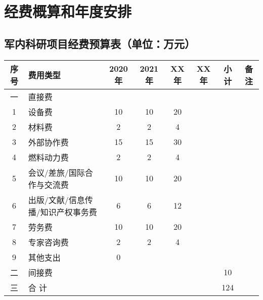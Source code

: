 


\section{经费概算和年度安排}


\subsection{军内科研项目经费预算表（单位：万元）}

\begin{table}[H]
	\centering
	\begin{tabular}{c m{4cm} cccccc}
		\toprule
		序号 & 费用类型                          & 2020年 & 2021年 & XX年 & XX年 & 小计 & 备注 \\
		\midrule
		一   & 直接费                                                                          \\
		1    & 设备费                            & 10     & 10     & 20                        \\
		2    & 材料费                            & 2      & 2      & 4                         \\
		3    & 外部协作费                        & 15     & 15     & 30                        \\
		4    & 燃料动力费                        & 2      & 2      & 4                         \\
		5    & 会议/差旅/国际合作与交流费        & 10     & 10     & 20                        \\
		6    & 出版/文献/信息传播/知识产权事务费 & 6      & 6      & 12                        \\
		7    & 劳务费                            & 10     & 10     & 20                        \\
		8    & 专家咨询费                        & 2      & 2      & 4                         \\
		9    & 其他支出                          & 0                                           \\
		二   & 间接费                            &        &        &      &      & 10          \\
		三   & 合 计                             &        &        &      &      & 124         \\
		\bottomrule
	\end{tabular}
\end{table}




